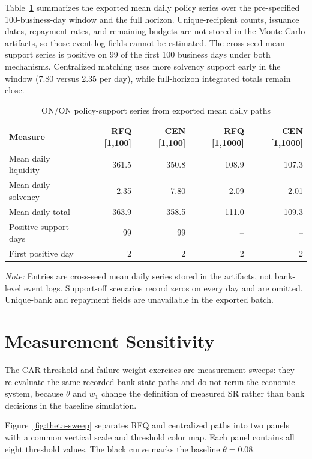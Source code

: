 Table~\ref{tab:policy-event} summarizes the exported mean daily policy
series over the pre-specified 100-business-day window and the full
horizon. Unique-recipient counts, issuance dates, repayment rates, and
remaining budgets are not stored in the Monte Carlo artifacts, so those
event-log fields cannot be estimated. The cross-seed mean support series is
positive on 99 of the first 100 business days under both mechanisms. Centralized
matching uses more solvency support early in the window (7.80 versus 2.35
per day), while full-horizon integrated totals remain close.

\begin{table}[htbp]
\centering
\caption{ON/ON policy-support series from exported mean daily paths}
\label{tab:policy-event}
\small
\begin{tabular}{@{}lrrrr@{}}
\toprule
\textbf{Measure} & \textbf{RFQ [1,100]} & \textbf{CEN [1,100]} & \textbf{RFQ [1,1000]} & \textbf{CEN [1,1000]}\\
\midrule
Mean daily liquidity & 361.5 & 350.8 & 108.9 & 107.3\\
Mean daily solvency & 2.35 & 7.80 & 2.09 & 2.01\\
Mean daily total & 363.9 & 358.5 & 111.0 & 109.3\\
Positive-support days & 99 & 99 & -- & --\\
First positive day & 2 & 2 & 2 & 2\\
\bottomrule
\end{tabular}
\begin{minipage}{0.96\textwidth}
\footnotesize
\textit{Note:} Entries are cross-seed mean daily series stored in the
artifacts, not bank-level event logs. Support-off scenarios record zeros
on every day and are omitted. Unique-bank and repayment fields are
unavailable in the exported batch.
\end{minipage}
\end{table}

\section{Measurement Sensitivity}

The CAR-threshold and failure-weight exercises are measurement sweeps:
they re-evaluate the same recorded bank-state paths and do not rerun the
economic system, because \(\theta\) and
\(w_1\) change the definition of measured SR rather than bank decisions in
the baseline simulation.

Figure~\ref{fig:theta-sweep} separates RFQ and centralized paths into two
panels with a common vertical scale and threshold color map. Each panel
contains all eight threshold values. The black curve marks the baseline
\(\theta=0.08\).

